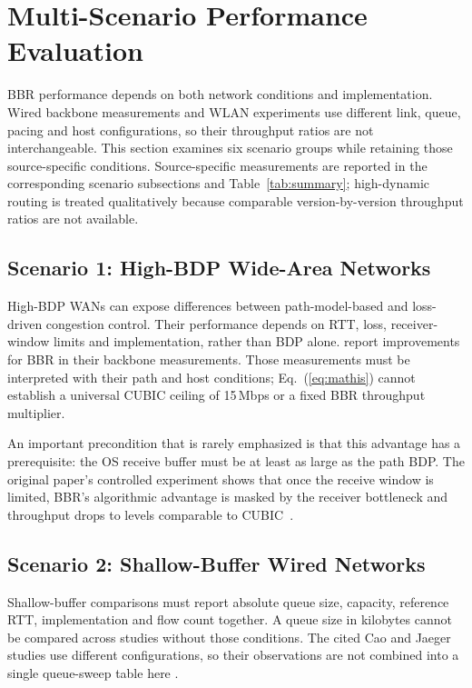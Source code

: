 \documentclass[a4paper,fleqn]{cas-sc}
\begin{document}
\section{Multi-Scenario Performance Evaluation}
\label{sec:comparison}

BBR performance depends on both network conditions and implementation.
Wired backbone measurements and WLAN experiments use different link,
queue, pacing and host configurations, so their throughput ratios are
not interchangeable. This section examines six scenario groups while
retaining those source-specific conditions. Source-specific
measurements are reported in the corresponding scenario subsections and
Table~\ref{tab:summary}; high-dynamic routing is treated
qualitatively because comparable version-by-version throughput ratios are not
available.

\subsection{Scenario 1: High-BDP Wide-Area Networks}
\label{sec:wan}

High-BDP WANs can expose differences between path-model-based and
loss-driven congestion control. Their performance depends on RTT, loss,
receiver-window limits and implementation, rather than BDP alone.
\citet{cardwell2017bbr} report improvements for BBR in their backbone
measurements. Those measurements must be interpreted with their path and
host conditions; Eq.~(\ref{eq:mathis}) cannot establish a universal CUBIC
ceiling of 15\,Mbps or a fixed BBR throughput multiplier.

An important precondition that is rarely emphasized is that this advantage has a
prerequisite: the OS receive buffer must be at least as large as the path BDP.
The original paper's controlled experiment shows that once the receive window is
limited, BBR's algorithmic advantage is masked by the receiver bottleneck and
throughput drops to levels comparable to CUBIC~\citep{cardwell2017bbr}.

\subsection{Scenario 2: Shallow-Buffer Wired Networks}
\label{sec:shallow}

Shallow-buffer comparisons must report absolute queue size, capacity,
reference RTT, implementation and flow count together. A queue size in
kilobytes cannot be compared across studies without those conditions.
The cited Cao and Jaeger studies use different configurations, so their
observations are not combined into a single queue-sweep table here
\citep{cao2019bbr,jaeger2019bbr}.
\end{document}
